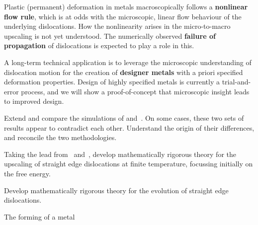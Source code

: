 \begin{workpackage}[id=WPkinetic,wphases=0-48,
short=Kin. control,
title=Kinetic control,
lead=TUE,
TUERM=36]
\begin{wpdescription}
Plastic (permanent) deformation in metals macroscopically follows a \textbf{nonlinear flow rule}, which is at odds with the microscopic, linear flow behaviour of the underlying dislocations. How the nonlinearity arises in the micro-to-macro upscaling is not yet understood. The numerically observed \textbf{failure of propagation} of dislocations is expected to play a role in this.

A long-term technical application is to leverage the microscopic understanding of dislocation motion for the creation of \textbf{designer metals} with a priori specified deformation properties. Design of highly specified metals is currently a trial-and-error process, and we will show a proof-of-concept that  microscopic insight leads to improved design.


%
%

\end{wpdescription}


\begin{tasklist}


  \begin{task}[title=Reconcile the simulations]
  Extend and compare the simulations of \cite[Ch.~9]{VanMeurs15TH}
  and~\cite[Ch.~6]{Kooiman15TH}. On some cases, these two sets of results appear to
  contradict each other. Understand the origin of their differences, and reconcile the two
  methodologies.
  \end{task}

  \begin{task}[title=Upscaling the energy]
  Taking the lead from~\cite[Ch.~2]{Kooiman15TH} and~\cite{SandierSerfaty12TR}, develop
  mathematically rigorous theory for the upscaling of straight edge dislocations at finite
  temperature, focussing initially on the free energy.
  \end{task}
  
  \begin{task}[title=Upscaling the evolution]
  Develop mathematically rigorous theory for the evolution of straight edge dislocations.
  \end{task}
  
  \begin{task}[title=Forming processes]
  The forming of a metal
  \end{task}


\end{tasklist}
\end{workpackage}

